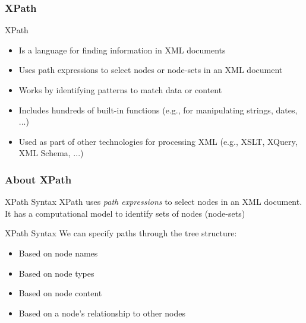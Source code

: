 \documentclass[svgnames]{beamer}
\begin{document}

\begin{frame}
\frametitle{XPath}

\begin{block}{XPath}
\begin{itemize}
 \item Is a language for finding information in XML documents
 \item Uses path expressions to select nodes or node-sets in an XML document
 \item Works by identifying patterns to match data or content
 \item Includes hundreds of built-in functions (e.g., for manipulating strings, dates, ...)
 \item Used as part of other technologies for processing XML (e.g., XSLT, XQuery, XML Schema, ...)
\end{itemize}
\end{block}

\end{frame}


\begin{frame}
\frametitle{About XPath}

\begin{block}{XPath Syntax}
XPath uses \emph{path expressions} to select nodes in an XML document. It has a computational model to identify sets of nodes (node-sets)
\end{block}

\begin{block}{XPath Syntax}
We can specify paths through the tree structure:
\begin{itemize}
 \item Based on node names
 \item Based on node types
 \item Based on node content
 \item Based on a node's relationship to other nodes
\end{itemize}
\end{block}

\end{frame}

\end{document}
